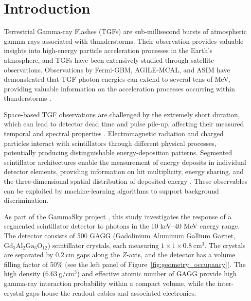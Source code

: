 \documentclass[11pt,twoside]{article}
\begin{document}
\section{Introduction}
Terrestrial Gamma-ray Flashes (TGFs) are sub-millisecond bursts of atmospheric gamma rays associated with thunderstorms. Their observation provides valuable insights into high-energy particle acceleration processes in the Earth's atmosphere, and TGFs have been extensively studied through satellite observations. Observations by Fermi-GBM, AGILE-MCAL, and ASIM have demonstrated that TGF photon energies can extend to several tens of MeV, providing valuable information on the acceleration processes occurring within thunderstorms \citep{Lindanger2021,Marisaldi2010,Ursi2019}.

Space-based TGF observations are challenged by the extremely short duration, which can lead to detector dead time and pulse pile-up, affecting their measured temporal and spectral properties \citep{Briggs2010}. Electromagnetic radiation and charged particles interact with scintillators through different physical processes, potentially producing distinguishable energy-deposition patterns. Segmented scintillator architectures enable the measurement of energy deposits in individual detector elements, providing information on hit multiplicity, energy sharing, and the three-dimensional spatial distribution of deposited energy \citep{SalehNatur2026}. These observables can be exploited by machine-learning algorithms to support background discrimination.

As part of the GammaSky project \citep{Castaldini2026}, this study investigates the response of a segmented scintillator detector to photons in the 10 keV--40 MeV energy range. The detector consists of 500 GAGG (Gadolinium Aluminum Gallium Garnet, $\mathrm{Gd_3Al_2Ga_3O_{12}}$) scintillator crystals, each measuring $1 \times 1 \times 0.8\ \mathrm{cm^3}$.
The crystals are separated by $0.2\ \mathrm{cm}$ gaps
along the $Z$-axis, and the detector has a volume filling factor of 50\% (see the left panel of
Figure~\ref{fig:geometry_occupancy}).  The high density ($6.63\ \mathrm{g/cm^3}$) and effective atomic number of GAGG provide high gamma-ray interaction probability within a compact volume, while the inter-crystal gaps house the readout cables and associated electronics.

\end{document}
